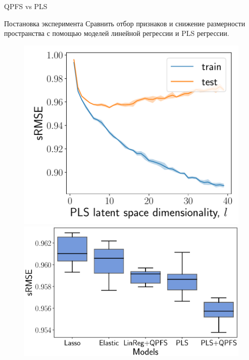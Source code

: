 \documentclass[9pt]{beamer}
\begin{document}
\begin{frame}{QPFS vs PLS}

\begin{block}{Постановка эксперимента}
	 	Сравнить отбор признаков и снижение размерности пространства с помощью моделей линейной регрессии и PLS регрессии.
\end{block}

\begin{figure}[h]
	\begin{minipage}{.43\linewidth}
		\centering
		\includegraphics[width=1.\linewidth]{figs/pls_vs_k}
	\end{minipage}%
	\begin{minipage}{.57\linewidth}
		\centering
		\includegraphics[width=1.\linewidth]{figs/models2}
	\end{minipage}
\end{figure}

\end{frame}
\end{document}
